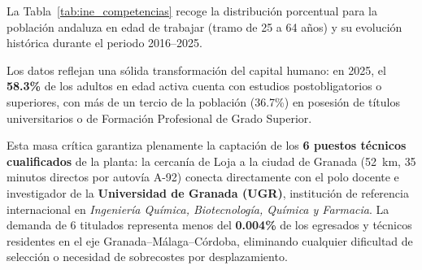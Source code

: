 \documentclass{report}
\begin{document}
La Tabla~\ref{tab:ine_competencias} recoge la distribución porcentual para la población andaluza en edad de trabajar (tramo de \num{25} a \num{64} años) y su evolución histórica durante el periodo 2016--2025.

\begin{table}[H]
    \centering
    \caption{Evolución del nivel de formación alcanzado por la población adulta (25 a 64 años) en Andalucía (INE, Tabla 69774).}
    \label{tab:ine_competencias}
\end{table}

Los datos reflejan una sólida transformación del capital humano: en 2025, el \textbf{\num{58.3}\%} de los adultos en edad activa cuenta con estudios postobligatorios o superiores, con más de un tercio de la población (\num{36.7}\%) en posesión de títulos universitarios o de Formación Profesional de Grado Superior. 

Esta masa crítica garantiza plenamente la captación de los \textbf{\num{6} puestos técnicos cualificados} de la planta: la cercanía de Loja a la ciudad de Granada (\SI{52}{\kilo\metre}, \num{35} minutos directos por autovía A-92) conecta directamente con el polo docente e investigador de la \textbf{Universidad de Granada (UGR)}, institución de referencia internacional en \textit{Ingeniería Química, Biotecnología, Química y Farmacia}. La demanda de \num{6} titulados representa menos del \textbf{\num{0.004}\%} de los egresados y técnicos residentes en el eje Granada--Málaga--Córdoba, eliminando cualquier dificultad de selección o necesidad de sobrecostes por desplazamiento.
\end{document}
